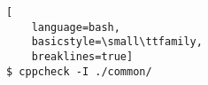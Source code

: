 \ApplyOnePageAppendixPageStyle{}

\begin{lstlisting}[
	language=bash,
	basicstyle=\small\ttfamily,
	breaklines=true]
$ cppcheck -I ./common/
\end{lstlisting}


